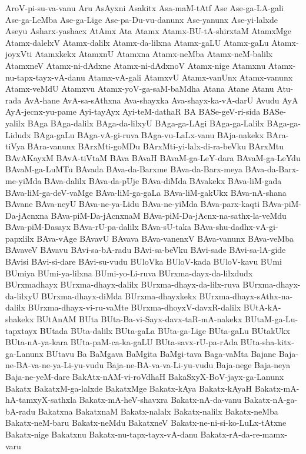 {AroV-pi-su-va-vanu
Aru
AsAyxni
Asakitx
Asa-maM-tAtf
Ase
Ase-ga-LA-gali
Ase-ga-LeMba
Ase-ga-Lige
Ase-pa-Du-vu-danunx
Ase-yanunx
Ase-yi-lalxde
Aseyu
Asharx-yashacx
AtAmx
Ata
Atamx
Atamx-BU-tA-shirxtaM
AtamxMge
Atamx-dalelxV
Atamx-dalilx
Atamx-da-lilxna
Atamx-gaLU
Atamx-gaLu
Atamx-joyxVti
Atamxkekx
AtamxnU
Atamxna
Atamx-neMba
Atamx-neM-balilx
AtamxneV
Atamx-ni-dAdxne
Atamx-ni-dAdxnoV
Atamx-nige
Atamxnu
Atamx-nu-tapx-tayx-vA-danu
Atamx-vA-gali
AtamxvU
Atamx-vanUnx
Atamx-vanunx
Atamx-veMdU
Atamxvu
Atamx-yoV-ga-saM-baMdha
Atana
Atane
Atanu
Atu-rada
AvA-hane
AvA-sa-sAthxna
Ava-shayxka
Ava-shayx-ka-vA-darU
Avudu
AyA
AyA-jecnx-yu-pame
Ayi-tayAyx
Ayi-teM-dathaR
BA
BASe-geV-ri-sida
BASe-yalilx
BAga
BAga-dalilx
BAga-da-lilxyU
BAga-ga-LAgi
BAga-ga-Lalilx
BAga-ga-Lidudx
BAga-gaLu
BAga-vA-gi-ruva
BAga-vu-LaLx-vanu
BAja-nakekx
BAra-tiVya
BAra-vanunx
BArxMti-goMDu
BArxMti-yi-lalx-di-ra-beVku
BArxMtu
BAvAKayxM
BAvA-tiVtaM
BAva
BAvaH
BAvaM-ga-LeY-dara
BAvaM-ga-LeYdu
BAvaM-ga-LuMTu
BAvada
BAva-da-Barxme
BAva-da-Barx-meya
BAva-da-Barx-me-yiMda
BAva-dalilx
BAva-da-pUje
BAva-diMda
BAvakekx
BAva-liM-gada
BAva-liM-ga-deV-vaMge
BAva-liM-ga-gaLa
BAva-liM-gakUkx
BAva-nA-shana
BAvane
BAva-neyU
BAva-ne-ya-Lidu
BAva-ne-yiMda
BAva-parx-kaqti
BAva-piM-Da-jAcnxna
BAva-piM-Da-jAcnxnaM
BAva-piM-Da-jAcnx-na-sathx-la-veMdu
BAva-piM-Dasayx
BAva-rU-pa-dalilx
BAva-sU-taka
BAva-shu-dadhx-vA-gi-papxlilx
BAva-vAge
BAvavU
BAvava
BAva-vanenxV
BAva-vanunx
BAva-veMba
BAvaveV
BAvavu
BAvi-sa-bA-radu
BAvi-sa-beVku
BAvi-sade
BAvi-sa-lA-gide
BAvisi
BAvi-si-dare
BAvi-su-vudu
BUloVka
BUloV-kada
BUloV-kavu
BUmi
BUmiya
BUmi-ya-lilxna
BUmi-yo-Li-ruva
BUrxma-dayx-da-lilxdudx
BUrxmadhayx
BUrxma-dhayx-dalilx
BUrxma-dhayx-da-lilx-ruva
BUrxma-dhayx-da-lilxyU
BUrxma-dhayx-diMda
BUrxma-dhayxkekx
BUrxma-dhayx-sAthx-na-dalilx
BUrxma-dhayx-vi-ru-vaMte
BUrxma-dhoyxV-davxR-dalilx
BUtA-kA-shakekx
BUtAnAM
BUta
BUta-Ba-vi-Sayx-davx-taR-mA-nakekx
BUtaM-ga-Lu-tapxtayx
BUtada
BUta-dalilx
BUta-gaLa
BUta-ga-Lige
BUta-gaLu
BUtakUkx
BUta-nA-ya-kara
BUta-paM-ca-ka-gaLU
BUta-savx-rU-pa-rAda
BUta-sha-kitx-ga-Lanunx
BUtavu
Ba
BaMgava
BaMgita
BaMgi-tava
Baga-vaMta
Bajane
Baja-ne-BA-va-ne-ya-Li-yu-vudu
Baja-ne-BA-va-va-Li-yu-vudu
Baja-nege
Baja-neya
Baja-ne-yeM-dare
BakAtx-nAM-vi-roVdhaH
BakaSxyX-BoV-jayx-ga-Lanunx
Bakatx
BakatxM-ga-lalxde
BakatxMge
Bakatx-kAya
Bakatx-kAyaH
Bakatx-mA-hA-tamxyX-sathxla
Bakatx-mA-heV-shavxra
Bakatx-nA-da-vanu
Bakatx-nA-ga-bA-radu
Bakatxna
BakatxnaM
Bakatx-nalalx
Bakatx-nalilx
Bakatx-neMba
Bakatx-neM-baru
Bakatx-neMdu
BakatxneV
Bakatx-ne-ni-si-ko-LuLx-tAtxne
Bakatx-nige
Bakatxnu
Bakatx-nu-tapx-tayx-vA-danu
Bakatx-rA-da-re-mamx-varu
}
